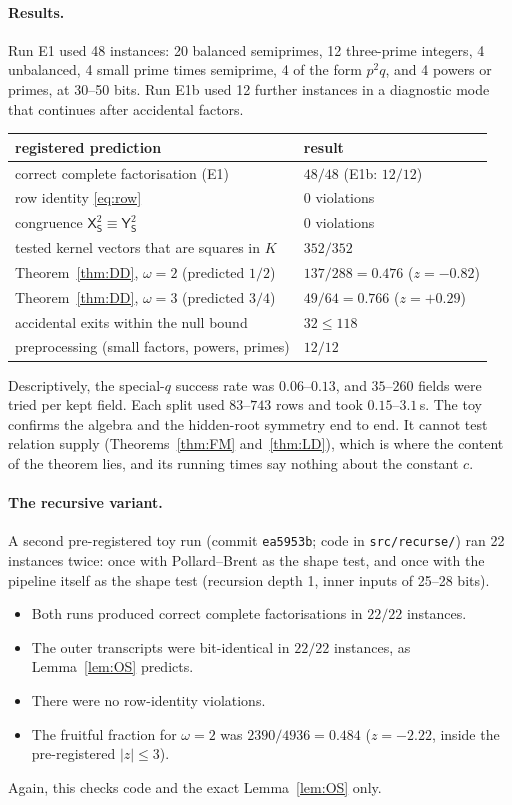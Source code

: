 \documentclass[11pt]{amsart}
\theoremstyle{definition}
\newcommand{\sS}{\mathsf{S}}
\newcommand{\sX}{\mathsf{X}}
\newcommand{\sY}{\mathsf{Y}}
\begin{document}
\paragraph{Results.} Run E1 used 48 instances: 20 balanced semiprimes, 12 three-prime integers, 4 unbalanced, 4 small prime times semiprime, 4 of the form
$p^2q$, and 4 powers or primes, at 30--50 bits. Run E1b used 12 further instances in a diagnostic mode that continues after accidental factors.
\begin{center}
\begin{tabular}{@{}ll@{}}
\toprule
registered prediction & result\\
\midrule
correct complete factorisation (E1) & $48/48$ (E1b: $12/12$)\\
row identity \eqref{eq:row} & $0$ violations\\
congruence $\sX_\sS^2\equiv\sY_\sS^2$ & $0$ violations\\
tested kernel vectors that are squares in $K$ & $352/352$\\
Theorem~\ref{thm:DD}, $\omega=2$ (predicted $1/2$) & $137/288=0.476$ ($z=-0.82$)\\
Theorem~\ref{thm:DD}, $\omega=3$ (predicted $3/4$) & $49/64=0.766$ ($z=+0.29$)\\
accidental exits within the null bound & $32\le118$\\
preprocessing (small factors, powers, primes) & $12/12$\\
\bottomrule
\end{tabular}
\end{center}
Descriptively, the special-$q$ success rate was $0.06$--$0.13$, and $35$--$260$ fields were tried per kept field. Each split used $83$--$743$
rows and took $0.15$--$3.1$\,s. The toy confirms the algebra and the hidden-root symmetry end to end. It cannot test relation supply
(Theorems~\ref{thm:FM} and~\ref{thm:LD}), which is where the content of the theorem lies, and its running times say nothing about
the constant $c$.

\paragraph{The recursive variant.} A second pre-registered toy run (commit \texttt{ea5953b}; code in \texttt{src/recurse/}) ran 22 instances
twice: once with Pollard--Brent as the shape test, and once with the pipeline itself as the shape test (recursion depth 1, inner
inputs of 25--28 bits).
\begin{itemize}
\item Both runs produced correct complete factorisations in $22/22$ instances.
\item The outer transcripts were bit-identical in $22/22$ instances, as Lemma~\ref{lem:OS} predicts.
\item There were no row-identity violations.
\item The fruitful fraction for $\omega=2$ was $2390/4936=0.484$ ($z=-2.22$, inside the pre-registered $|z|\le3$).
\end{itemize}
Again, this checks code and the exact Lemma~\ref{lem:OS} only.
\end{document}
